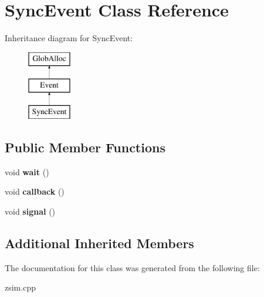 \hypertarget{classSyncEvent}{\section{Sync\-Event Class Reference}
\label{classSyncEvent}
}
Inheritance diagram for Sync\-Event\-:\begin{figure}[H]
\begin{center}
\leavevmode
\includegraphics[height=3.000000cm]{classSyncEvent}
\end{center}
\end{figure}
\subsection*{Public Member Functions}
\begin{DoxyCompactItemize}
\item 
\hypertarget{classSyncEvent_a296ea2eca64006ab953c3298aae9ccdc}{void {\bfseries wait} ()}\label{classSyncEvent_a296ea2eca64006ab953c3298aae9ccdc}

\item 
\hypertarget{classSyncEvent_a262255519b2c2f076393d47dd2ef7a1f}{void {\bfseries callback} ()}\label{classSyncEvent_a262255519b2c2f076393d47dd2ef7a1f}

\item 
\hypertarget{classSyncEvent_aeef7bb7a4b588464897c10cadd6036ef}{void {\bfseries signal} ()}\label{classSyncEvent_aeef7bb7a4b588464897c10cadd6036ef}

\end{DoxyCompactItemize}
\subsection*{Additional Inherited Members}


The documentation for this class was generated from the following file\-:\begin{DoxyCompactItemize}
\item 
zsim.\-cpp\end{DoxyCompactItemize}
